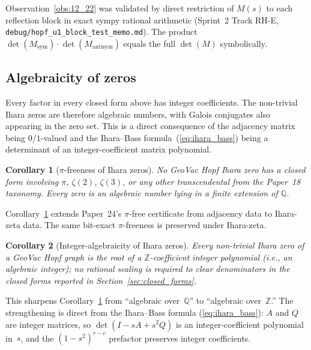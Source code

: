 \documentclass[11pt]{article}
\newtheorem{corollary}{Corollary}
\begin{document}
Observation~\ref{obs:12_22} was validated by direct restriction of
$M(s)$ to each reflection block in exact sympy rational arithmetic
(Sprint~2 Track RH-E, \texttt{debug/hopf\_u1\_block\_test\_memo.md}).
The product $\det(M_{\text{sym}})\cdot\det(M_{\text{antisym}})$ equals
the full $\det(M)$ symbolically.

\subsection{Algebraicity of zeros}

Every factor in every closed form above has integer coefficients.
The non-trivial Ihara zeros are therefore algebraic numbers, with
Galois conjugates also appearing in the zero set.  This is a direct
consequence of the adjacency matrix being $0/1$-valued and the
Ihara--Bass formula~(\ref{eq:ihara_bass}) being a determinant of an
integer-coefficient matrix polynomial.

\begin{corollary}[$\pi$-freeness of Ihara zeros]
\label{cor:pi_free}
No GeoVac Hopf Ihara zero has a closed form involving $\pi$, $\zeta(2)$,
$\zeta(3)$, or any other transcendental from the Paper~18 taxonomy.
Every zero is an algebraic number lying in a finite extension of
$\mathbb{Q}$.
\end{corollary}

Corollary~\ref{cor:pi_free} extends Paper~24's $\pi$-free
certificate from adjacency data to Ihara-zeta data.  The same
bit-exact $\pi$-freeness is preserved under Ihara-zeta.

\begin{corollary}[Integer-algebraicity of Ihara zeros]
\label{cor:int_alg}
Every non-trivial Ihara zero of a GeoVac Hopf graph is the root of
a $\mathbb{Z}$-coefficient integer polynomial (i.e., an algebraic
integer); no rational scaling is required to clear denominators in
the closed forms reported in Section~\ref{sec:closed_forms}.
\end{corollary}

This sharpens Corollary~\ref{cor:pi_free} from ``algebraic over~$\mathbb{Q}$''
to ``algebraic over~$\mathbb{Z}$.'' The strengthening is direct from
the Ihara--Bass formula (\ref{eq:ihara_bass}): $A$ and $Q$ are integer
matrices, so $\det(I - sA + s^2 Q)$ is an integer-coefficient polynomial
in~$s$, and the $(1-s^2)^{r-c}$ prefactor preserves integer coefficients.
\end{document}
